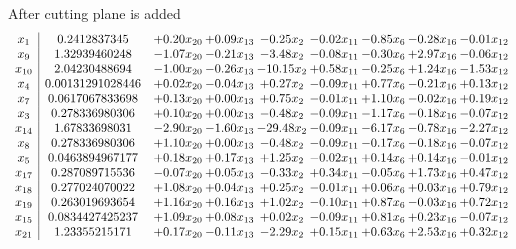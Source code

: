 \documentclass[8pt]{article}
\begin{document}
 After cutting plane is added 
\[\begin{array}{c| c c@{\hskip 2pt} c@{\hskip 2pt} c@{\hskip 2pt} c@{\hskip 2pt} c@{\hskip 2pt} c@{\hskip 2pt} c@{\hskip 2pt} }
 x_{1}   &  0.2412837345 & +  0.20 x_{20} & +  0.09 x_{13} & -0.25 x_{2} & -0.02 x_{11} & -0.85 x_{6} & -0.28 x_{16} & -0.01 x_{12}\\
 x_{9}   &  1.32939460248 & -1.07 x_{20} & -0.21 x_{13} & -3.48 x_{2} & -0.08 x_{11} & -0.30 x_{6} & +  2.97 x_{16} & -0.06 x_{12}\\
 x_{10}   &  2.04230488694 & -1.00 x_{20} & -0.26 x_{13} & -10.15 x_{2} & +  0.58 x_{11} & -0.25 x_{6} & +  1.24 x_{16} & -1.53 x_{12}\\
 x_{4}   &  0.00131291028446 & +  0.02 x_{20} & -0.04 x_{13} & +  0.27 x_{2} & -0.09 x_{11} & +  0.77 x_{6} & -0.21 x_{16} & +  0.13 x_{12}\\
 x_{7}   &  0.0617067833698 & +  0.13 x_{20} & +  0.00 x_{13} & +  0.75 x_{2} & -0.01 x_{11} & +  1.10 x_{6} & -0.02 x_{16} & +  0.19 x_{12}\\
 x_{3}   &  0.278336980306 & +  0.10 x_{20} & +  0.00 x_{13} & -0.48 x_{2} & -0.09 x_{11} & -1.17 x_{6} & -0.18 x_{16} & -0.07 x_{12}\\
 x_{14}   &  1.67833698031 & -2.90 x_{20} & -1.60 x_{13} & -29.48 x_{2} & -0.09 x_{11} & -6.17 x_{6} & -0.78 x_{16} & -2.27 x_{12}\\
 x_{8}   &  0.278336980306 & +  1.10 x_{20} & +  0.00 x_{13} & -0.48 x_{2} & -0.09 x_{11} & -0.17 x_{6} & -0.18 x_{16} & -0.07 x_{12}\\
 x_{5}   &  0.0463894967177 & +  0.18 x_{20} & +  0.17 x_{13} & +  1.25 x_{2} & -0.02 x_{11} & +  0.14 x_{6} & +  0.14 x_{16} & -0.01 x_{12}\\
 x_{17}   &  0.287089715536 & -0.07 x_{20} & +  0.05 x_{13} & -0.33 x_{2} & +  0.34 x_{11} & -0.05 x_{6} & +  1.73 x_{16} & +  0.47 x_{12}\\
 x_{18}   &  0.277024070022 & +  1.08 x_{20} & +  0.04 x_{13} & +  0.25 x_{2} & -0.01 x_{11} & +  0.06 x_{6} & +  0.03 x_{16} & +  0.79 x_{12}\\
 x_{19}   &  0.263019693654 & +  1.16 x_{20} & +  0.16 x_{13} & +  1.02 x_{2} & -0.10 x_{11} & +  0.87 x_{6} & -0.03 x_{16} & +  0.72 x_{12}\\
 x_{15}   &  0.0834427425237 & +  1.09 x_{20} & +  0.08 x_{13} & +  0.02 x_{2} & -0.09 x_{11} & +  0.81 x_{6} & +  0.23 x_{16} & -0.07 x_{12}\\
 x_{21}   &  1.23355215171 & +  0.17 x_{20} & -0.11 x_{13} & -2.29 x_{2} & +  0.15 x_{11} & +  0.63 x_{6} & +  2.53 x_{16} & +  0.32 x_{12}\\

\end{array}\]
\end{document}

